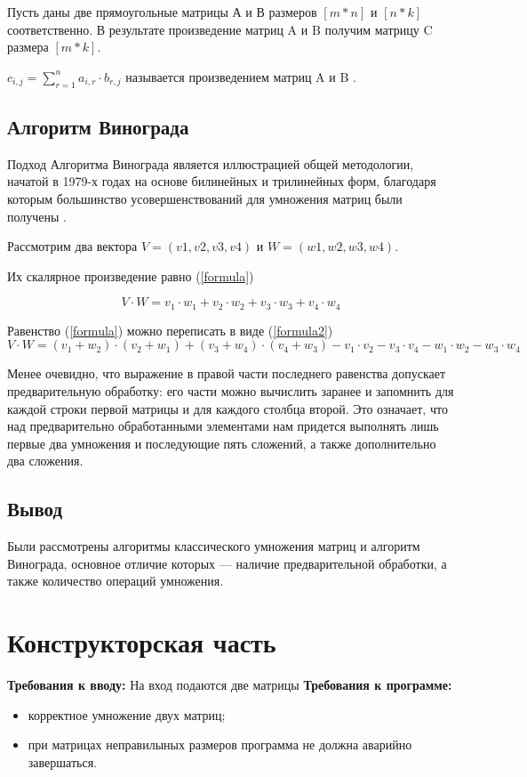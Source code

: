 \documentclass[12pt]{report}
\begin{document}
Пусть даны две прямоугольные матрицы А и В размеров $[m * n]$ и $[n * k]$ соответственно.  
В результате произведение матриц A и B получим матрицу C размера $[m *  k]$.


$c_{i,j} = \sum\limits_{r=1}^n a_{i,r}\cdot b_{r,j}$ называется произведением матриц A и B \cite{Beloysov}.


\section{Алгоритм Винограда}
Подход Алгоритма Винограда является иллюстрацией общей методологии, начатой в 1979-х годах на основе
билинейных и трилинейных форм, благодаря которым большинство усовершенствований для умножения матриц были получены \cite{Gall2012}.

Рассмотрим два вектора $V = (v1, v2, v3, v4)$ и $W = (w1, w2, w3, w4)$.  

Их скалярное произведение равно (\ref{formula}) 

\begin{equation} \label{formula}
V \cdot W=v_1 \cdot w_1 + v_2 \cdot w_2 + v_3 \cdot w_3 + v_4 \cdot w_4
\end{equation}

Равенство (\ref{formula}) можно переписать в виде (\ref{formula2}) 
\begin{equation} \label{formula2}
V \cdot W=(v_1 + w_2) \cdot (v_2 + w_1) + (v_3 + w_4) \cdot (v_4 + w_3) - v_1 \cdot v_2 - v_3 \cdot v_4 - w_1 \cdot w_2 - w_3 \cdot w_4
\end{equation}

Менее очевидно, что выражение в правой части последнего равенства допускает предварительную обработку: его части можно вычислить заранее и запомнить для каждой строки первой матрицы и для каждого столбца второй. 
Это означает, что над предварительно обработанными элементами нам придется выполнять лишь первые два умножения и последующие пять сложений, а также дополнительно два сложения. 

\section{Вывод}
Были рассмотрены алгоритмы классического умножения матриц и алгоритм Винограда, основное отличие которых — наличие предварительной обработки, а также количество операций умножения.

\chapter{Конструкторская часть}
\textbf{Требования к вводу:}
На вход подаются две матрицы
\newline
\textbf{Требования к программе:}
\begin{itemize}
	\item корректное умножение двух матриц;
	\item при матрицах неправилыных размеров программа не должна аварийно завершаться.
\end{itemize}
\end{document}

